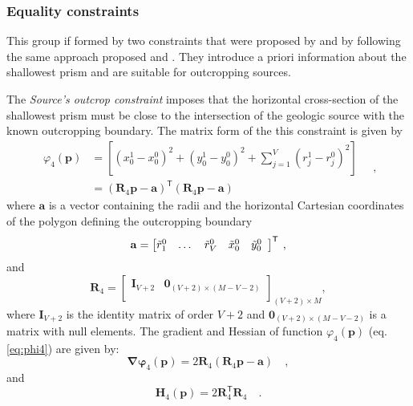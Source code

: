 \subsubsection{Equality constraints}

This group if formed by two constraints that were proposed by \cite{oliveirajr-etal2011} and \cite{oliveirajr-barbosa2013} by following the same approach proposed \cite{barbosa-etal1997} and 
\cite{barbosa-etal1999}. They introduce a priori information about the shallowest prism and are  suitable for outcropping sources.

The \textit{Source’s outcrop constraint} imposes that the horizontal cross-section of the shallowest prism 
must be close to the intersection of the geologic source with the known outcropping boundary. 
The matrix form of the this constraint is given by
\begin{equation}\label{eq:phi4}
\begin{split}
\varphi_{4}(\mathbf{p}) &= \left[\left(x_{0}^{1} - x_{0}^{0}\right)^2 + \left(y_{0}^{1} - y_{0}^{0}\right)^2 + \sum\limits^{V}_{j=1}\left(r^{1}_{j}-r^{0}_{j}\right)^2\right] \\
&= \left(\mathbf{R}_{4} \mathbf{p} - \mathbf{a} \right)^{\mathsf{T}} 
\left(\mathbf{R}_{4} \mathbf{p} - \mathbf{a} \right)
\end{split} \quad ,
\end{equation}
where $\mathbf{a}$ is a vector containing the radii and the horizontal Cartesian coordinates of the 
polygon defining the outcropping boundary
\begin{equation}
\mathbf{a} = \left[ \begin{array}{@{}*{12}{c}@{}}
\tilde{r}_{1}^{0} & \dots & \tilde{r}_{V}^{0} & \tilde{x}_{0}^{0} & \tilde{y}_{0}^{0} \\
\end{array} \right]^{\mathsf{T}} \: ,
\label{eq:a-vector}
\end{equation}
and
\begin{equation}
\mathbf{R}_{4} = 
\begin{bmatrix}
\mathbf{I}_{V+2} & \mathbf{0}_{(V+2) \times (M-V-2)} \\
\end{bmatrix}_{(V+2)\times M},
\label{eq:R4-matrix}
\end{equation}
where $\mathbf{I}_{V+2}$ is the identity matrix of order $V+2$ and $\mathbf{0}_{(V+2) \times (M-V-2)}$ is a matrix 
with null elements. The gradient and Hessian of function $\varphi_{4}(\mathbf{p})$ (eq. \ref{eq:phi4}) are given by:
\begin{equation}\label{eq:phi4_grad}
\boldsymbol{\nabla\varphi}_{4}(\mathbf{p}) = 2 \mathbf{R}_{4} 
\left(\mathbf{R}_{4} \mathbf{p} - \mathbf{a} \right) \quad ,
\end{equation}
and
\begin{equation}\label{eq:phi4_hessian}
\mathbf{H}_{4}(\mathbf{p}) = 2 \mathbf{R}^{\mathsf{T}}_{4}\mathbf{R}_{4} \quad .
\end{equation}

